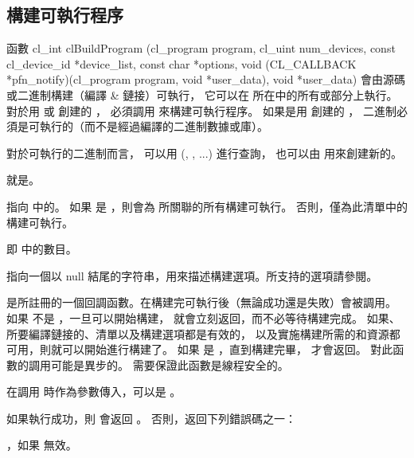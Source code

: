 \subsection{構建可執行程序}

函數
\startclc
cl_int clBuildProgram (cl_program program,
			cl_uint num_devices,
			const cl_device_id *device_list,
			const char *options,
			void (CL_CALLBACK *pfn_notify)(cl_program program,
						void *user_data),
			void *user_data)
\stopclc
會由源碼或二進制構建（編譯 & 鏈接）可執行，
它可以在  所在中的所有或部分上執行。
對於用  或  創建的 ，
必須調用  來構建可執行程序。
如果是用  創建的 ，
二進制必須是可執行的（而不是經過編譯的二進制數據或庫）。

對於可執行的二進制而言，
可以用 (, , ...) 進行查詢，
也可以由  用來創建新的。

 就是。

 指向  中的。
如果  是 ，則會為  所關聯的所有構建可執行。
否則，僅為此清單中的構建可執行。

 即  中的數目。

 指向一個以 null 結尾的字符串，用來描述構建選項。所支持的選項請參閱。

 是所註冊的一個回調函數。在構建完可執行後（無論成功還是失敗）會被調用。
如果  不是 ，一旦可以開始構建，  就會立刻返回，而不必等待構建完成。
如果、所要編譯鏈接的、清單以及構建選項都是有效的，
以及實施構建所需的和資源都可用，則就可以開始進行構建了。
如果  是 ，直到構建完畢，  才會返回。
對此函數的調用可能是異步的。
需要保證此函數是線程安全的。

 在調用  時作為參數傳入，可以是 。

如果執行成功，則  會返回 。
否則，返回下列錯誤碼之一：
\startigBase
\item {}，如果  無效。

